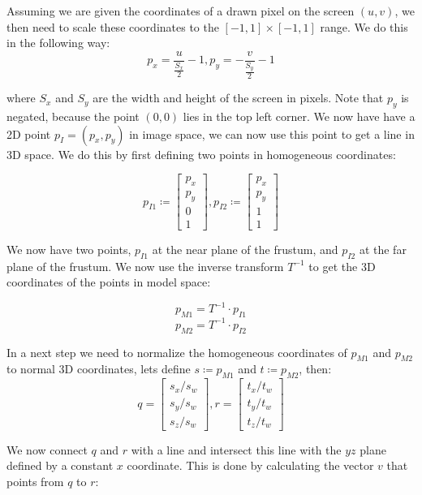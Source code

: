 Assuming we are given the coordinates of a drawn pixel on the screen $(u,v)$, we then need to scale these coordinates to the $[-1,1] \times [-1,1]$ range. We do this in the following way:
\[
    p_x = \frac{u}{\frac{S_x}{2}} - 1, p_y = -\frac{v}{\frac{S_y}{2}} - 1 
\]

where $S_x$ and $S_y$ are the width and height of the screen in pixels. Note that $p_y$ is negated, because the point $(0,0)$ lies in the top left corner. We now have have a 2D point $p_I = (p_x,p_y)$ in image space, we can now use this point to get a line in 3D space. 
We do this by first defining two points in homogeneous coordinates:

\[
    p_{I1} \coloneqq 
    \begin{bmatrix}
        p_x \\ p_y \\ 0 \\ 1
    \end{bmatrix},
    p_{I2} \coloneqq
    \begin{bmatrix}
        p_x \\ p_y \\ 1 \\ 1
    \end{bmatrix}
\]

We now have two points, $p_{I1}$ at the near plane of the frustum, and $p_{I2}$ at the far plane of the frustum. We now use the inverse transform $T^{-1}$ to get the 3D coordinates of the points in model space:

\[p_{M1} = T^{-1} \cdot p_{I1}\]
\[p_{M2} = T^{-1} \cdot p_{I2}\]

In a next step we need to normalize the homogeneous coordinates of $p_{M1}$ and $p_{M2}$ to normal 3D coordinates, lets define $s \coloneqq p_{M1}$ and $t \coloneqq p_{M2}$, then:
\[
    q = 
    \begin{bmatrix}
    s_x/s_w \\ s_y/s_w \\ s_z/s_w
    \end{bmatrix},
    r = 
    \begin{bmatrix}
    t_x/t_w \\ t_y/t_w \\ t_z/t_w
    \end{bmatrix}
    \]

We now connect $q$ and $r$ with a line and intersect this line with the $yz$ plane defined by a constant $x$ coordinate. This is done by calculating the vector $v$ that points from $q$ to $r$:


